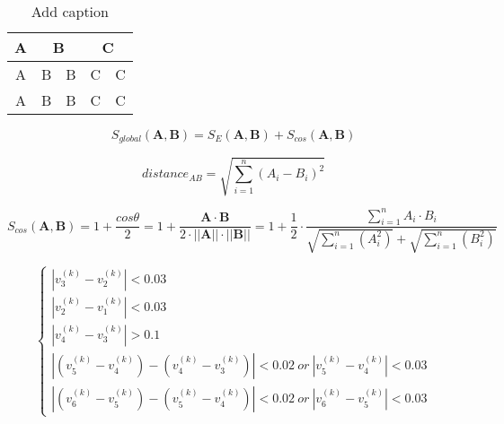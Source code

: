 \documentclass[12pt]{article}  %
\newenvironment{shrinkeq}[1]
{ \bgroup
	\addtolength\abovedisplayshortskip{#1}
	\addtolength\abovedisplayskip{#1}
	\addtolength\belowdisplayshortskip{#1}
	\addtolength\belowdisplayskip{#1}}
{\egroup\ignorespacesafterend}
\begin{document}
\begin{table}[htbp]
  \centering
  \caption{Add caption}
    \begin{tabular}{c|c|c|c|c}
    \hline
    \hline
    \rowcolor[rgb]{ 1,  .902,  .6} A     & \multicolumn{2}{c|}{\cellcolor[rgb]{ .886,  .937,  .855} B} & \multicolumn{2}{c}{\cellcolor[rgb]{ 1,  .4,  0} C} \\
    \hline
    \rowcolor[rgb]{ 1,  .902,  .6} A     & \cellcolor[rgb]{ .886,  .937,  .855} B & \cellcolor[rgb]{ .886,  .937,  .855} B & \cellcolor[rgb]{ 1,  .4,  0} C & \cellcolor[rgb]{ 1,  .4,  0} C \\
    \hline
    \rowcolor[rgb]{ 1,  .902,  .6} A     & \cellcolor[rgb]{ .886,  .937,  .855} B & \cellcolor[rgb]{ .886,  .937,  .855} B & \cellcolor[rgb]{ 1,  .4,  0} C & \cellcolor[rgb]{ 1,  .4,  0} C \\
    \hline
    \hline
    \end{tabular}%
  \label{tab:best}%
\end{table}%

\begin{shrinkeq}{-1ex}
	\begin{equation}\label{eq:glo}
	S_{global}(\mathbf{A},\mathbf{B})=S_E(\mathbf{A},\mathbf{B})+S_{cos}(\mathbf{A},\mathbf{B})
	\end{equation}
\end{shrinkeq}

\begin{shrinkeq}{-1.5ex}
	\begin{equation}
	distance_{AB}=\sqrt{\sum\limits_{i=1}^{n}(A_i-B_i)^2}
	\end{equation}
\end{shrinkeq}

\begin{shrinkeq}{-1.5ex}
	\begin{equation}\label{eq:cos}
	S_{cos}(\mathbf{A},\mathbf{B})=1+\frac{cos\theta}{2}=1+\frac{\mathbf{A}\cdot\mathbf{B}}{2\cdot||\mathbf{A}||\cdot||\mathbf{B}||}=1+\frac{1}{2}\cdot\frac{\sum\limits_{i=1}^{n}A_i\cdot B_i}{\sqrt{\sum\limits_{i=1}^{n}(A_i^2)}+\sqrt{\sum\limits_{i=1}^{n}(B_i^2)}}
	\end{equation}
\end{shrinkeq}

\begin{shrinkeq}{-1.5ex}
	\begin{equation}\label{eq:control}
		\begin{cases}
		|v_3^{(k)}-v_2^{(k)}|<0.03\\
		|v_2^{(k)}-v_1^{(k)}|<0.03\\
		|v_4^{(k)}-v_3^{(k)}|>0.1\\
		|(v_5^{(k)}-v_4^{(k)})-(v_4^{(k)}-v_3^{(k)})|<0.02\ or\ |v_5^{(k)}-v_4^{(k)}|<0.03\\
		|(v_6^{(k)}-v_5^{(k)})-(v_5^{(k)}-v_4^{(k)})|<0.02\ or\ |v_6^{(k)}-v_5^{(k)}|<0.03
		\end{cases}
	\end{equation}
\end{shrinkeq}
\end{document}
